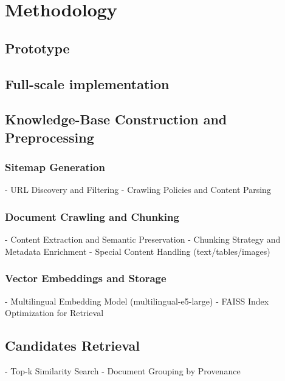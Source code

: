 \chapter{Methodology}
\label{chap:methodology}
\begin{spacing}{1.5}

\section{Prototype}

\section{Full-scale implementation}

\section{Knowledge-Base Construction and Preprocessing}
\subsection{Sitemap Generation}
      - URL Discovery and Filtering
      - Crawling Policies and Content Parsing
\subsection{Document Crawling and Chunking}
      - Content Extraction and Semantic Preservation
      - Chunking Strategy and Metadata Enrichment
      - Special Content Handling (text/tables/images)
\subsection{Vector Embeddings and Storage}
      - Multilingual Embedding Model (multilingual-e5-large)
      - FAISS Index Optimization for Retrieval

\section{Candidates Retrieval}
      - Top-k Similarity Search
      - Document Grouping by Provenance


\end{spacing}
